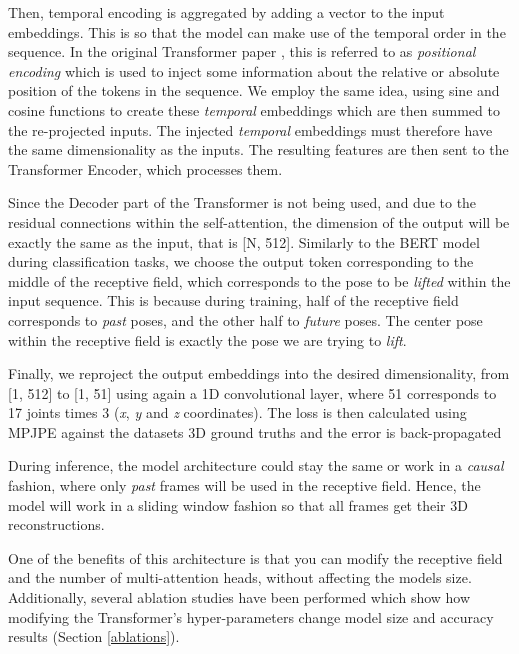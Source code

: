 \documentclass[letterpaper]{article}
\begin{document}
Then, temporal encoding is aggregated by adding a vector to the input embeddings. This is so that the model can make use of the temporal order in the sequence. In the original Transformer paper \cite{vaswani17}, this is referred to as \textit{positional encoding} which is used to inject some information about the relative or absolute position of the tokens in the sequence. We employ the same idea, using sine and cosine functions to create these \textit{temporal} embeddings which are then summed to the re-projected inputs. The injected \textit{temporal} embeddings must therefore have the same dimensionality as the inputs. The resulting features are then sent to the Transformer Encoder, which processes them.

Since the Decoder part of the Transformer is not being used, and due to the residual connections within the self-attention, the dimension of the output will be exactly the same as the input, that is [N, 512]. Similarly to the BERT model \cite{devlin18} during classification tasks, we choose the output token corresponding to the middle of the receptive field, which corresponds to the pose to be \textit{lifted} within the input sequence. This is because during training, half of the receptive field corresponds to \textit{past} poses, and the other half to \textit{future} poses. The center pose within the receptive field is exactly the pose we are trying to \textit{lift}.

Finally, we reproject the output embeddings into the desired dimensionality, from [1, 512] to [1, 51] using again a 1D convolutional layer, where 51 corresponds to 17 joints times 3 (\textit{x}, \textit{y} and \textit{z} coordinates). The loss is then calculated using MPJPE against the datasets 3D ground truths and the error is back-propagated

During inference, the model architecture could stay the same or work in a \textit{causal} fashion, where only \textit{past} frames will be used in the receptive field. Hence, the model will work in a sliding window fashion so that all frames get their 3D reconstructions.

One of the benefits of this architecture is that you can modify the receptive field and the number of multi-attention heads, without affecting the models size. Additionally, several ablation studies have been performed which show how modifying the Transformer's hyper-parameters change model size and accuracy results (Section \ref{ablations}).
\end{document}
